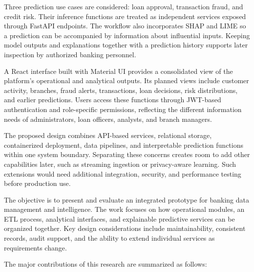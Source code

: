 \documentclass[conference]{IEEEtran}
\begin{document}
Three prediction use cases are considered: loan approval, transaction fraud, and credit risk. Their inference functions are treated as independent services exposed through FastAPI endpoints. The workflow also incorporates SHAP and LIME so a prediction can be accompanied by information about influential inputs. Keeping model outputs and explanations together with a prediction history supports later inspection by authorized banking personnel.

A React interface built with Material UI provides a consolidated view of the platform's operational and analytical outputs. Its planned views include customer activity, branches, fraud alerts, transactions, loan decisions, risk distributions, and earlier predictions. Users access these functions through JWT-based authentication and role-specific permissions, reflecting the different information needs of administrators, loan officers, analysts, and branch managers.

The proposed design combines API-based services, relational storage, containerized deployment, data pipelines, and interpretable prediction functions within one system boundary. Separating these concerns creates room to add other capabilities later, such as streaming ingestion or privacy-aware learning. Such extensions would need additional integration, security, and performance testing before production use.

The objective is to present and evaluate an integrated prototype for banking data management and intelligence. The work focuses on how operational modules, an ETL process, analytical interfaces, and explainable predictive services can be organized together. Key design considerations include maintainability, consistent records, audit support, and the ability to extend individual services as requirements change.

The major contributions of this research are summarized as follows:
\end{document}
